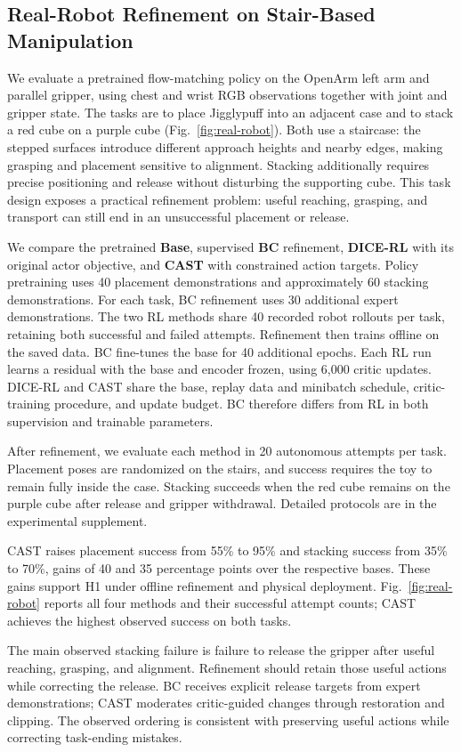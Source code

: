 \subsection{Real-Robot Refinement on Stair-Based Manipulation}
\label{sec:exp-real-robot}

We evaluate a pretrained flow-matching policy on the OpenArm left arm
and parallel gripper, using chest and wrist RGB observations together with
joint and gripper state. The tasks are to place Jigglypuff into an adjacent
case and to stack a red cube on a purple cube
(Fig.~\ref{fig:real-robot}). Both use a staircase: the stepped surfaces
introduce different approach heights and nearby edges, making grasping and
placement sensitive to alignment. Stacking additionally requires precise
positioning and release without disturbing the supporting cube. This task
design exposes a practical refinement problem: useful reaching, grasping,
and transport can still end in an unsuccessful placement or release.

We compare the pretrained \textbf{Base}, supervised \textbf{BC} refinement,
\textbf{DICE-RL} with its original actor objective, and \textbf{CAST} with
constrained action targets. Policy pretraining uses 40 placement
demonstrations and approximately 60 stacking demonstrations. For each
task, BC refinement uses 30 additional expert demonstrations. The two RL
methods share 40 recorded robot rollouts per task, retaining both
successful and failed attempts. Refinement then trains offline on the
saved data. BC fine-tunes the base for 40 additional epochs. Each RL run learns a residual with the base and
encoder frozen, using 6,000 critic updates. DICE-RL and CAST share the base, replay data and
minibatch schedule, critic-training procedure, and update budget. BC
therefore differs from RL in both supervision and trainable parameters.

After refinement, we evaluate each method in 20 autonomous attempts per
task. Placement poses are randomized on the stairs, and success requires
the toy to remain fully inside the case. Stacking succeeds when the red
cube remains on the purple cube after release and gripper withdrawal.
Detailed protocols are in the experimental supplement.

CAST raises placement success from 55\% to 95\% and stacking success from
35\% to 70\%, gains of 40 and 35 percentage points over the respective
bases. These gains support H1 under offline refinement and physical
deployment. Fig.~\ref{fig:real-robot} reports all four methods and their
successful attempt counts; CAST achieves the highest observed success on
both tasks.

The main observed stacking failure is failure to release the gripper after
useful reaching, grasping, and alignment. Refinement should retain those
useful actions while correcting the release. BC receives explicit release
targets from expert demonstrations; CAST moderates critic-guided changes
through restoration and clipping. The observed ordering is consistent
with preserving useful actions while correcting task-ending mistakes.
